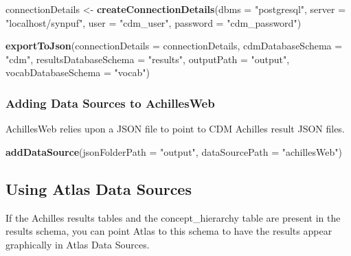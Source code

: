 \documentclass[]{article}
\newenvironment{Shaded}{\begin{snugshade}}{\end{snugshade}}
\newcommand{\KeywordTok}[1]{\textcolor[rgb]{0.13,0.29,0.53}{\textbf{#1}}}
\newcommand{\DataTypeTok}[1]{\textcolor[rgb]{0.13,0.29,0.53}{#1}}
\newcommand{\StringTok}[1]{\textcolor[rgb]{0.31,0.60,0.02}{#1}}
\newcommand{\NormalTok}[1]{#1}
\begin{document}
\begin{Shaded}
\begin{Highlighting}[]
\NormalTok{connectionDetails <-}\StringTok{ }\KeywordTok{createConnectionDetails}\NormalTok{(}\DataTypeTok{dbms =} \StringTok{"postgresql"}\NormalTok{, }
                                             \DataTypeTok{server =} \StringTok{"localhost/synpuf"}\NormalTok{, }
                                             \DataTypeTok{user =} \StringTok{"cdm_user"}\NormalTok{, }
                                             \DataTypeTok{password =} \StringTok{"cdm_password"}\NormalTok{)}

\KeywordTok{exportToJson}\NormalTok{(}\DataTypeTok{connectionDetails =}\NormalTok{ connectionDetails, }
             \DataTypeTok{cdmDatabaseSchema =} \StringTok{"cdm"}\NormalTok{, }
             \DataTypeTok{resultsDatabaseSchema =} \StringTok{"results"}\NormalTok{, }
             \DataTypeTok{outputPath =} \StringTok{"output"}\NormalTok{, }
             \DataTypeTok{vocabDatabaseSchema =} \StringTok{"vocab"}\NormalTok{)}
\end{Highlighting}
\end{Shaded}

\subsubsection{Adding Data Sources to
AchillesWeb}\label{adding-data-sources-to-achillesweb}

AchillesWeb relies upon a JSON file to point to CDM Achilles result JSON
files.

\begin{Shaded}
\begin{Highlighting}[]
\KeywordTok{addDataSource}\NormalTok{(}\DataTypeTok{jsonFolderPath =} \StringTok{"output"}\NormalTok{, }
              \DataTypeTok{dataSourcePath =} \StringTok{"achillesWeb"}\NormalTok{)}
\end{Highlighting}
\end{Shaded}

\subsection{Using Atlas Data Sources}\label{using-atlas-data-sources}

If the Achilles results tables and the concept\_hierarchy table are
present in the results schema, you can point Atlas to this schema to
have the results appear graphically in Atlas Data Sources.
\end{document}

